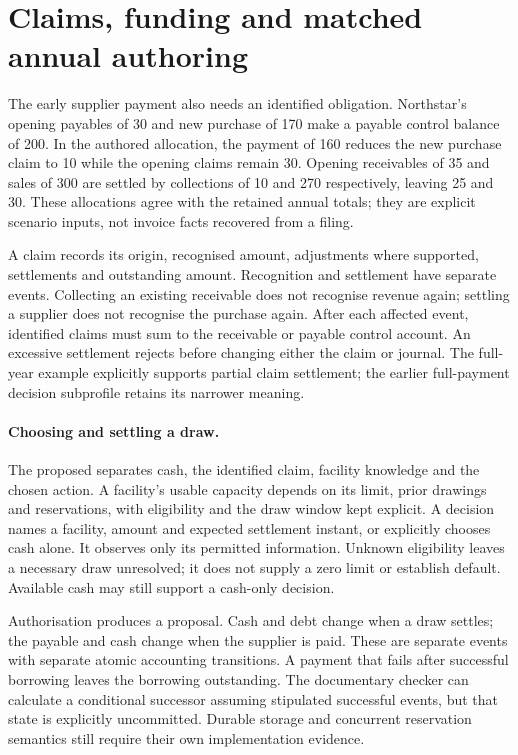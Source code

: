 \section{Claims, funding and matched annual authoring}
\label{sec:funded-year-authoring}

The early supplier payment also needs an identified obligation. Northstar's
opening payables of 30 and new purchase of 170 make a payable control balance
of 200. In the authored allocation, the payment of 160 reduces the new purchase
claim to 10 while the opening claims remain 30. Opening receivables of 35 and
sales of 300 are settled by collections of 10 and 270 respectively, leaving
25 and 30. These allocations agree with the retained annual totals; they are
explicit scenario inputs, not invoice facts recovered from a filing.

A claim records its origin, recognised amount, adjustments where supported,
settlements and outstanding amount. Recognition and settlement have separate
events. Collecting an existing receivable does not recognise revenue again;
settling a supplier does not recognise the purchase again. After each affected
event, identified claims must sum to the receivable or payable control account.
An excessive settlement rejects before changing either the claim or journal.
The full-year example explicitly supports partial claim settlement; the earlier
full-payment decision subprofile retains its narrower meaning.

\paragraph{Choosing and settling a draw.}
The proposed  separates cash, the identified
claim, facility knowledge and the chosen action. A facility's usable capacity
depends on its limit, prior drawings and reservations, with eligibility and
the draw window kept explicit. A decision names a facility, amount and expected
settlement instant, or explicitly chooses cash alone. It observes only its
permitted information. Unknown eligibility leaves a necessary draw unresolved;
it does not supply a zero limit or establish default. Available cash may still
support a cash-only decision.

Authorisation produces a proposal. Cash and debt change when a draw settles;
the payable and cash change when the supplier is paid. These are separate
events with separate atomic accounting transitions. A payment that fails after
successful borrowing leaves the borrowing outstanding. The documentary checker
can calculate a conditional successor assuming stipulated successful events,
but that state is explicitly uncommitted. Durable storage and concurrent
reservation semantics still require their own implementation evidence.

